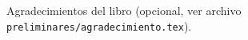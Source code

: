 


Agradecimientos del libro (opcional, ver archivo \texttt{preliminares/agradecimiento.tex}).

\cleardoublepage
\endinput
